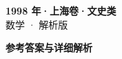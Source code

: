 \documentclass[zihao=-4, a4paper]{ctexart}
\begin{document}
\begin{center}
  {\Large\bfseries 1998 年·上海卷·文史类}\\[4pt]
  {\large 数学 · 解析版}
\end{center}
\medskip
{}

\clearpage
{}
\begin{center}{\Large\bfseries 参考答案与详细解析}\end{center}
\medskip

\end{document}
